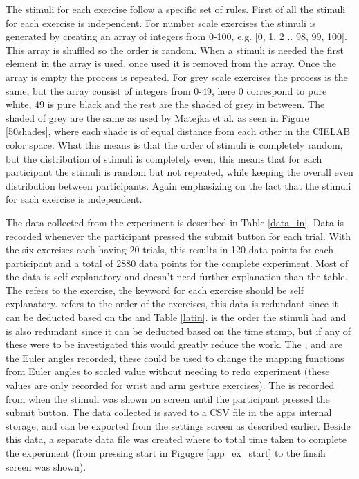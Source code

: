 The stimuli for each exercise follow a specific set of rules. First of all the stimuli for each exercise is independent. For number scale exercises the stimuli is generated by creating an array of integers from 0-100, e.g. [0, 1, 2 .. 98, 99, 100]. This array is shuffled so the order is random. When a stimuli is needed the first element in the array is used, once used it is removed from the array. Once the array is empty the process is repeated. For grey scale exercises the process is the same, but the array consist of integers from 0-49, here 0 correspond to pure white, 49 is pure black and the rest are the shaded of grey in between. The shaded of grey are the same as used by Matejka et al.\cite{grey} as seen in Figure \ref{50shades}, where each shade is of equal distance from each other in the CIELAB color space\cite{cielab}. What this means is that the order of stimuli is completely random, but the distribution of stimuli is completely even, this means that for each participant the stimuli is random but not repeated, while keeping the overall even distribution between participants. Again emphasizing on the fact that the stimuli for each exercise is independent.

The data collected from the experiment is described in Table \ref{data_in}. Data is recorded whenever the participant pressed the submit button for each trial. With the six exercises each having 20 trials, this results in 120 data points for each participant and a total of 2880 data points for the complete experiment. Most of the data is self explanatory and doesn't need further explanation than the table. The  refers to the exercise, the keyword for each exercise should be self explanatory.  refers to the order of the exercises, this data is redundant since it can be deducted based on the  and Table \ref{latin}.  is the order the stimuli had and is also redundant since it can be deducted based on the time stamp, but if any of these were to be investigated this would greatly reduce the work. The ,  and  are the Euler angles recorded, these could be used to change the mapping functions from Euler angles to scaled value without needing to redo experiment (these values are only recorded for wrist and arm gesture exercises). The  is recorded from when the stimuli was shown on screen until the participant pressed the submit button. The data collected is saved to a CSV file in the apps internal storage, and can be exported from the settings screen as described earlier. Beside this data, a separate data file was created where to total time taken to complete the experiment (from pressing start in Figugre \ref{app_ex_start} to the finsih screen was shown).


